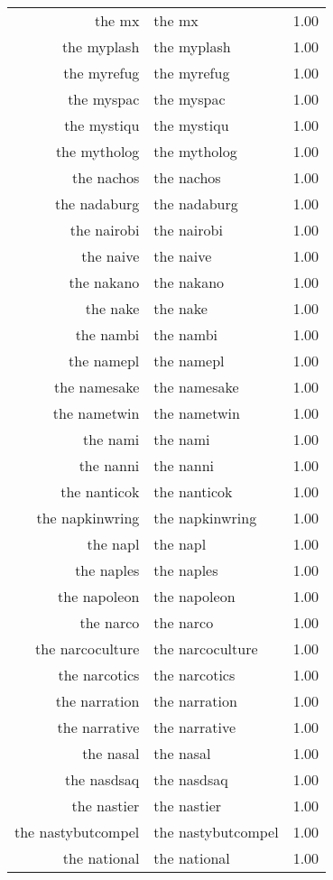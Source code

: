 \begin{table}[ht]
\begin{tabular}{rlr}
  the mx & the mx & 1.00 \\ 
  the myplash & the myplash & 1.00 \\ 
  the myrefug & the myrefug & 1.00 \\ 
  the myspac & the myspac & 1.00 \\ 
  the mystiqu & the mystiqu & 1.00 \\ 
  the mytholog & the mytholog & 1.00 \\ 
  the nachos & the nachos & 1.00 \\ 
  the nadaburg & the nadaburg & 1.00 \\ 
  the nairobi & the nairobi & 1.00 \\ 
  the naive & the naive & 1.00 \\ 
  the nakano & the nakano & 1.00 \\ 
  the nake & the nake & 1.00 \\ 
  the nambi & the nambi & 1.00 \\ 
  the namepl & the namepl & 1.00 \\ 
  the namesake & the namesake & 1.00 \\ 
  the nametwin & the nametwin & 1.00 \\ 
  the nami & the nami & 1.00 \\ 
  the nanni & the nanni & 1.00 \\ 
  the nanticok & the nanticok & 1.00 \\ 
  the napkinwring & the napkinwring & 1.00 \\ 
  the napl & the napl & 1.00 \\ 
  the naples & the naples & 1.00 \\ 
  the napoleon & the napoleon & 1.00 \\ 
  the narco & the narco & 1.00 \\ 
  the narcoculture & the narcoculture & 1.00 \\ 
  the narcotics & the narcotics & 1.00 \\ 
  the narration & the narration & 1.00 \\ 
  the narrative & the narrative & 1.00 \\ 
  the nasal & the nasal & 1.00 \\ 
  the nasdsaq & the nasdsaq & 1.00 \\ 
  the nastier & the nastier & 1.00 \\ 
  the nastybutcompel & the nastybutcompel & 1.00 \\ 
  the national & the national & 1.00 \\ 

\end{tabular}
\end{table}
